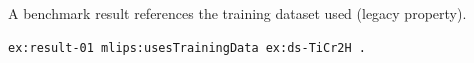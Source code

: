 A benchmark result references the training dataset used (legacy property).
\begin{lstlisting}[language=turtle]
ex:result-01 mlips:usesTrainingData ex:ds-TiCr2H .
\end{lstlisting}
